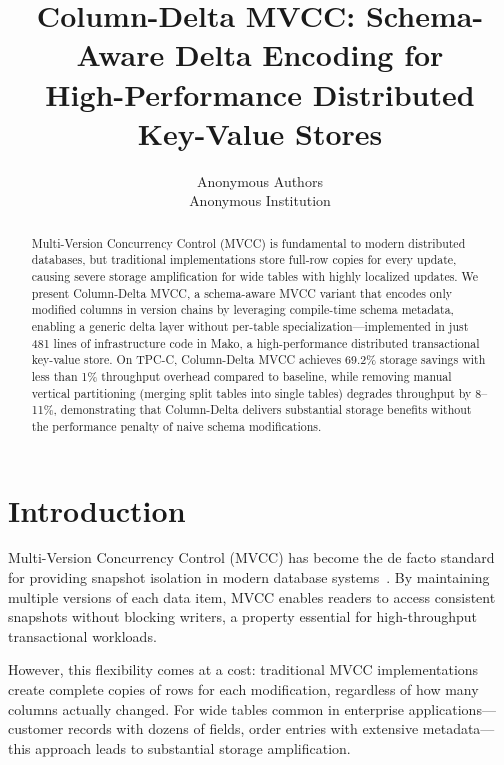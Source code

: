 \documentclass[letterpaper,twocolumn,10pt]{article}
\begin{document}
\title{\Large \bf Column-Delta MVCC: Schema-Aware Delta Encoding for\\High-Performance Distributed Key-Value Stores}

\author{
{\rm Anonymous Authors}\\
Anonymous Institution
}

\maketitle

\begin{abstract}
Multi-Version Concurrency Control (MVCC) is fundamental to modern distributed databases, but traditional implementations store full-row copies for every update, causing severe storage amplification for wide tables with highly localized updates. We present Column-Delta MVCC, a schema-aware MVCC variant that encodes only modified columns in version chains by leveraging compile-time schema metadata, enabling a generic delta layer without per-table specialization---implemented in just 481 lines of infrastructure code in Mako, a high-performance distributed transactional key-value store. On TPC-C, Column-Delta MVCC achieves 69.2\% storage savings with less than 1\% throughput overhead compared to baseline, while removing manual vertical partitioning (merging split tables into single tables) degrades throughput by 8--11\%, demonstrating that Column-Delta delivers substantial storage benefits without the performance penalty of naive schema modifications.
\end{abstract}

\section{Introduction}

Multi-Version Concurrency Control (MVCC) has become the de facto standard for providing snapshot isolation in modern database systems~\cite{bernstein1987concurrency}. By maintaining multiple versions of each data item, MVCC enables readers to access consistent snapshots without blocking writers, a property essential for high-throughput transactional workloads.

However, this flexibility comes at a cost: traditional MVCC implementations create complete copies of rows for each modification, regardless of how many columns actually changed. For wide tables common in enterprise applications---customer records with dozens of fields, order entries with extensive metadata---this approach leads to substantial storage amplification.
\end{document}
